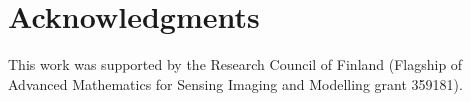 \documentclass[11pt,a4paper]{article}
\theoremstyle{definition}
\theoremstyle{remark} \newtheorem{remark}[theorem]{Remark}
\numberwithin{equation}{section}
\numberwithin{figure}{section}
\numberwithin{algorithm}{section}
\numberwithin{table}{section}
\begin{document}


\section*{Acknowledgments}
This work was supported by the Research Council of Finland (Flagship of Advanced Mathematics for Sensing Imaging and Modelling grant 359181).


{\small
  
  
}
\end{document}
